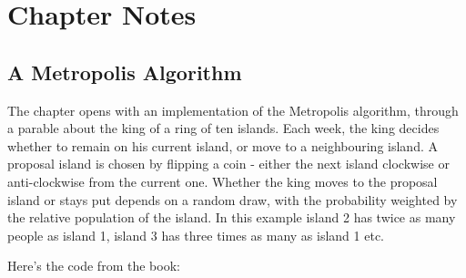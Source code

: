 \documentclass[
]{book}
\begin{document}
\hypertarget{chapter-notes-8}{%
\section{Chapter Notes}\label{chapter-notes-8}}

\hypertarget{a-metropolis-algorithm}{%
\subsection*{A Metropolis Algorithm}\label{a-metropolis-algorithm}}

The chapter opens with an implementation of the Metropolis algorithm, through a parable about the king of a ring of ten islands. Each week, the king decides whether to remain on his current island, or move to a neighbouring island. A proposal island is chosen by flipping a coin - either the next island clockwise or anti-clockwise from the current one. Whether the king moves to the proposal island or stays put depends on a random draw, with the probability weighted by the relative population of the island. In this example island 2 has twice as many people as island 1, island 3 has three times as many as island 1 etc.

Here's the code from the book:
\end{document}
